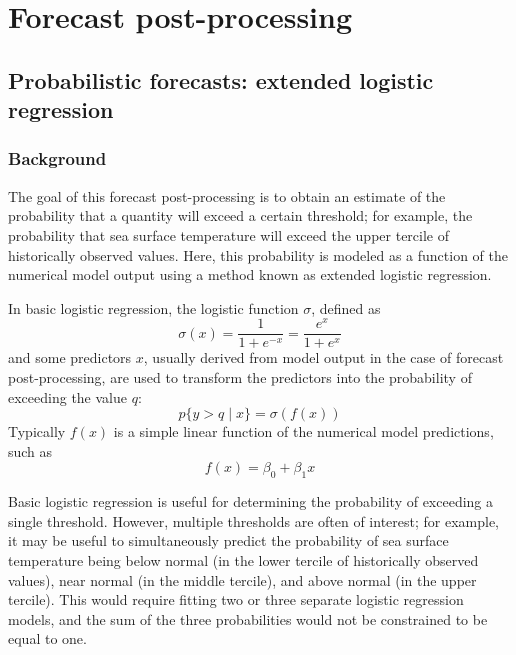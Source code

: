 \documentclass[12pt]{article}
\title{}
\author{}
\date{\today}
\begin{document}
\section{Forecast post-processing}

\subsection{Probabilistic forecasts: extended logistic regression}


\subsubsection{Background}

The goal of this forecast post-processing is to obtain an estimate of the probability that a quantity will exceed a certain
threshold; for example, the probability that sea surface temperature will exceed the upper tercile
of historically observed values. Here, this probability is modeled as a function of the numerical model output
using a method known as extended logistic regression.

In basic logistic regression, the logistic function $\sigma$, defined as
\begin{equation}
\sigma(x) = \frac{1}{1 + e^{-x}} = \frac{e^x}{1 + e^x}
\end{equation}
and some predictors $x$, usually derived from model output in the case of forecast post-processing,
are used to transform the predictors into the probability of exceeding the value $q$:
\begin{equation}
    p \{ y > q  \mid x \}= \sigma(f(x))
\end{equation}
Typically $f(x)$ is a simple linear function of the numerical model predictions,
such as
\begin{equation}
    f(x) = \beta_0 + \beta_1 x
\end{equation}

Basic logistic regression is useful for determining the probability of
exceeding a single threshold. However, multiple thresholds are often of interest; for example,
it may be useful to simultaneously predict the probability of sea surface temperature being below
normal (in the lower tercile of historically observed values),
near normal (in the middle tercile), and above normal (in the upper tercile).
This would require fitting two or three separate logistic regression models,
and the sum of the three probabilities would not be constrained to be equal to one.
\end{document}

